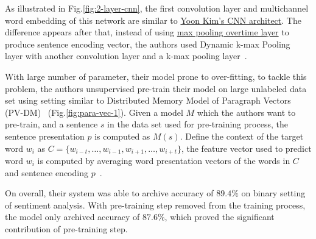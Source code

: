 As illustrated in Fig.\ref{fig:2-layer-cnn}, the first convolution layer and multichannel word embedding of this network are similar to \hyperref[kim-cnn]{Yoon Kim's CNN architect}.
The difference appears after that, instead of using  \hyperref[sec:max-overtime-pooling]{max pooling overtime layer} to produce sentence encoding vector, the authors used Dynamic k-max Pooling~\cite{DCNN} layer with another convolution layer and a k-max pooling layer~\cite{DCNN}. 

With large number of parameter, their model prone to over-fitting, to tackle this problem, the authors unsupervised pre-train their model on large unlabeled data set using setting similar to Distributed Memory Model of Paragraph Vectors (PV-DM)~\cite{ParagraphVec} (Fig.\ref{fig:para-vec-1}).
Given a model \(M\) which the authors want to pre-train, and a sentence \(s\) in the data set used for pre-training process, the sentence presentation \(p\) is computed as \(M(s)\). 
Define the context of the target word \(w_i\) as \(C = \{w_{i-t},\ldots,w_{i-1}, w_{i+1},\ldots,w_{i+t}\}\), the feature vector used to predict word \(w_i\) is computed by averaging word presentation vectors of the words in \(C\) and sentence encoding \(p\)~\cite{2-layer-cnn}.
 
On overall, their system was able to archive accuracy of \(89.4\%\) on binary setting of sentiment analysis. 
With pre-training step removed from the training process, the model only archived accuracy of \(87.6\%\), which proved the significant contribution of pre-training step.~\cite{2-layer-cnn}
